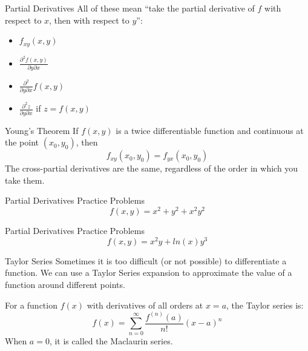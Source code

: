 \documentclass[aspectratio=169]{beamer}
\begin{document}
\begin{frame}{Partial Derivatives}\label{main1}
    All of these mean “take the partial derivative of $f$ with respect to $x$, then with respect to $y$”:
    \begin{itemize}
        \item $f_{xy}(x, y)$
        \item $\frac{\partial^2 f(x, y)}{\partial y \partial x}$
        \item $\frac{\partial^2}{\partial y \partial x} f(x, y)$
        \item $\frac{\partial^2 z}{\partial y \partial x}$ if $z = f(x, y)$
    \end{itemize}
\end{frame}

\begin{frame}{Young's Theorem}\label{main1}
    If $f(x, y)$ is a twice differentiable function and continuous at the point $(x_0, y_0)$, then
    \[
    f_{xy}(x_0, y_0) = f_{yx}(x_0, y_0)
    \]
    The cross-partial derivatives are the same, regardless of the order in which you take them.
\end{frame}

\begin{frame}{Partial Derivatives Practice Problems}\label{main1}
	\vspace{-4cm}
     \[
    f(x,y) = x^{2} + y^{2} + x^{2}y^{2}
    \]
\end{frame}

\begin{frame}{Partial Derivatives Practice Problems}\label{main1}
	\vspace{-4cm}
     \[
    f(x,y) = x^{2}y+ln(x)y^{3}
    \]
\end{frame}

\begin{frame}{Taylor Series}\label{main1}
Sometimes it is too difficult (or not possible) to differentiate a function.  We can use a Taylor Series expansion to approximate the value of a function around different points.

For a function $f(x)$ with derivatives of all orders at $x=a$, the Taylor series is:
\[
f(x) = \sum_{n=0}^{\infty} \frac{f^{(n)}(a)}{n!} (x - a)^n
\]
When $a=0$, it is called the Maclaurin series.

\end{frame}
\end{document}

